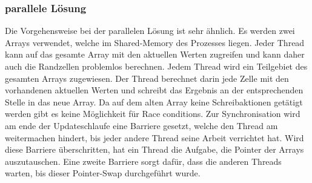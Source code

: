 \subsubsection{parallele Lösung 
\label{parallelisierung:sub:parLoesung}}
Die Vorgehensweise bei der parallelen Lösung ist sehr ähnlich.
Es werden zwei Arrays verwendet, welche im Shared-Memory des Prozesses liegen.
Jeder Thread kann auf das gesamte Array mit den aktuellen Werten zugreifen und kann daher auch die Randzellen problemlos berechnen.
Jedem Thread wird ein Teilgebiet des gesamten Arrays zugewiesen.
Der Thread berechnet darin jede Zelle mit den vorhandenen aktuellen Werten und schreibt das Ergebnis an der entsprechenden Stelle in das neue Array.
Da auf dem alten Array keine Schreibaktionen getätigt werden gibt es keine Möglichkeit für Race conditions.
Zur Synchronisation wird am ende der Updateschlaufe eine Barriere gesetzt, welche den Thread am weitermachen hindert, bis jeder andere Thread seine Arbeit verrichtet hat.
Wird diese Barriere überschritten, hat ein Thread die Aufgabe, die Pointer der Arrays auszutauschen.
Eine zweite Barriere sorgt dafür, dass die anderen Threads warten, bis dieser Pointer-Swap durchgeführt wurde.

